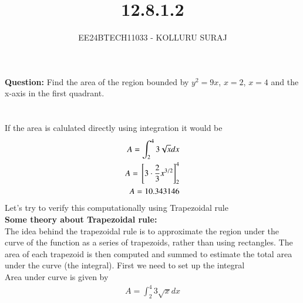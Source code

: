 \documentclass[journal]{IEEEtran}
\numberwithin{equation}{enumi}
\numberwithin{figure}{enumi}
\begin{document}

\title{12.8.1.2}
\author{EE24BTECH11033 - KOLLURU SURAJ}
{\let\newpage\relax\maketitle}
\textbf{Question:} 
Find the area of the region bounded by $y^2=9x$, $x=2$, $x=4$ and the x-axis in the first quadrant.
\\\\
\solution\\
If the area is calulated directly using integration it would be 
\begin{align}
     A= \int_{2}^{4} 3\sqrt{x}dx\\
     A={}\left[3\cdot \frac{2}{3} x^{3/2}\right]_2^4\\
     A =10.343146
\end{align}
Let's try to verify this computationally using Trapezoidal rule\\
\textbf{Some theory about Trapezoidal rule:}\\
The idea behind the trapezoidal rule is to approximate the region under the curve of the function as a series of trapezoids, rather than using rectangles. The area of each trapezoid is then computed and summed to estimate the total area under the curve (the integral).
First we need to set up the integral\\
Area under curve is given by
\begin{align}
    A= \int_{2}^{4} 3\sqrt{x}dx
\end{align}
\end{document}

